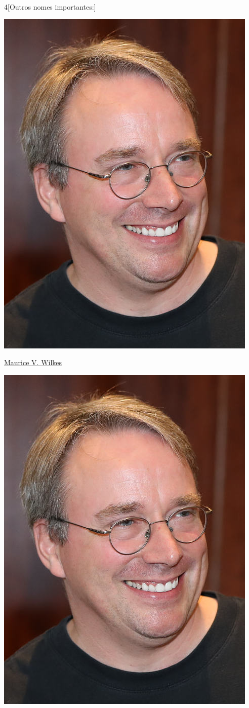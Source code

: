 \begin{multicols}{4}[Outros nomes importantes:]
\begin{center}
					\includegraphics[width=.8\columnwidth]{./IMG-GIT/CIENTISTAS/linus.jpeg}
\end{center}
				
\vfill\null
\columnbreak				
				
				\href{https://pt.wikipedia.org/wiki/Maurice_V._Wilkes}{Maurice V. Wilkes}
				
\begin{center}
					\includegraphics[width=.8\columnwidth]{./IMG-GIT/CIENTISTAS/linus.jpeg}
\end{center}
				

\end{multicols}
